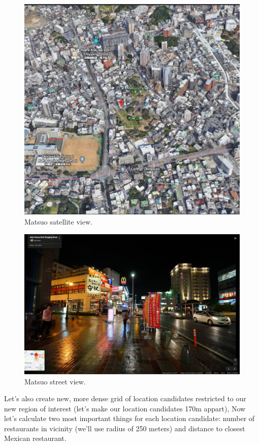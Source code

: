 \documentclass[11pt]{article}
\begin{document}
\begin{figure}[H]
    \centering
        \includegraphics[scale=.4]{figures/matsuo.png}
    \caption{Matsuo satellite view.}
    \label{fig:1}
\end{figure}

\begin{figure}[H]
    \centering
        \includegraphics[scale=.4]{figures/matsuo3.png}
    \caption{Matsuo street view.}
    \label{fig:1}
\end{figure}


Let's also create new, more dense grid of location candidates restricted to our new region of interest (let's make our location candidates 170m appart), Now let's calculate two most important things for each location candidate: number of restaurants in vicinity (we'll use radius of 250 meters) and distance to closest Mexican restaurant.
\end{document}
